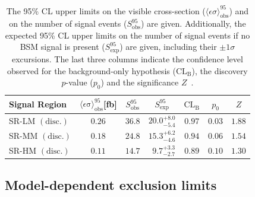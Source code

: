 \begin{table}
\begin{center}
\begin{tabular}{lcccccc}
\toprule
\textbf{Signal Region}                       & $\langle\epsilon{\mathrm{ \sigma}}\rangle_{\mathrm{ obs}}^{95}$[fb]  &  $S_{\mathrm{ obs}}^{95}$  & $S_{\mathrm{ exp}}^{95}$ & $\textrm{CL}_{\textrm{B}}$ & $p_{0}$ & $Z$  \\
\midrule
 SR-LM $\mathrm{(disc.)}$    & $0.26$ &  $36.8$ & $ { 20.0 }^{ +8.0 }_{ -5.4 }$ & $0.97$ & $ 0.03$&$1.88$ \\%
 SR-MM $\mathrm{(disc.)}$    & $0.18$ &  $24.8$ & $ { 15.3 }^{ +6.2 }_{ -4.6 }$ & $0.94$ & $ 0.06$&$1.54$ \\%
 SR-HM $\mathrm{(disc.)}$    & $0.11$ &  $14.7$ & $ { ~~9.7 }^{ +3.3 }_{ -2.7 }$ & $0.89$ & $ 0.10$&$1.30$ \\%

\bottomrule
\end{tabular}
\caption[Breakdown of upper limits.]{
The 95\% CL upper limits on the visible cross-section ($\langle\epsilon\sigma\rangle_{\mathrm{ obs}}^{95}$) and on the number of
signal events ($S_{\mathrm{ obs}}^{95}$) are given. Additionally, the expected 95\% CL upper limits on the number of signal events if no BSM signal is present ($S_{\mathrm{ exp}}^{95}$) are given, including their $\pm 1\sigma$ excursions. The last three columns indicate the confidence level observed for the background-only hypothesis ($\textrm{CL}_{\textrm{B}}$), the discovery $p$-value ($p_{0}$) and the significance $Z$~\cite{Cousins:2007bmb}.}
\label{tab:upperlimit_toys}
\end{center}
\end{table}


\subsection{Model-dependent exclusion limits}

